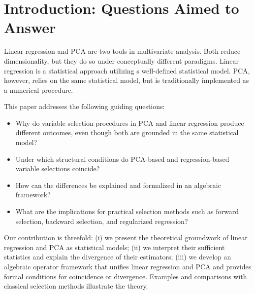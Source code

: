 \section{Introduction: Questions Aimed to Answer}

Linear regression and PCA are two tools in multivariate analysis. Both reduce dimensionality, but they do so under conceptually different paradigms. Linear regression is a statistical approach utilizing s well-defined statistical model. PCA, however, relies on the same statistical model, but is traditionally implemented as a numerical procedure.

This paper addresses the following guiding questions:
\begin{itemize}
    \item Why do variable selection procedures in PCA and linear regression produce different outcomes, even though both are grounded in the same statistical model?
    \item Under which structural conditions do PCA-based and regression-based variable selections coincide?
    \item How can the differences be explained and formalized in an algebraic framework?
    \item What are the implications for practical selection methods such as forward selection, backward selection, and regularized regression?
\end{itemize}

Our contribution is threefold: 
(i) we present the theoretical groundwork of linear regression and PCA as statistical models; 
(ii) we interpret their sufficient statistics and explain the divergence of their estimators; 
(iii) we develop an algebraic operator framework that unifies linear regression and PCA and provides formal conditions for coincidence or divergence. 
Examples and comparisons with classical selection methods illustrate the theory. 
